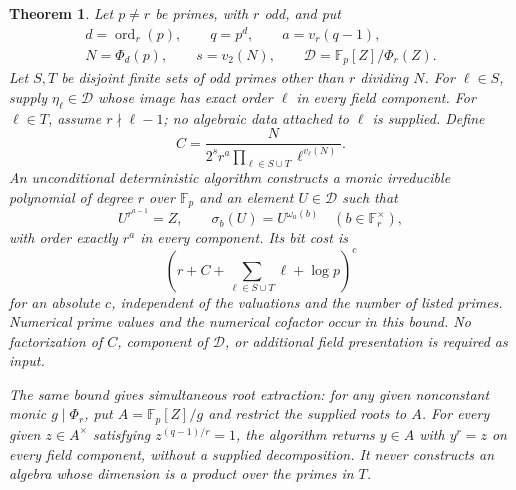 \documentclass[11pt]{article}
\newtheorem{theorem}{Theorem}[section]
\theoremstyle{definition}
\theoremstyle{remark}
\begin{document}
\begin{theorem}\label{thm:selected-cyclotomic-cofactor}
Let \(p\ne r\) be primes, with \(r\) odd, and put
\[
 \begin{gathered}
 d=\operatorname{ord}_r(p),\qquad q=p^d,\qquad a=v_r(q-1),\\
 N=\Phi_d(p),\qquad s=v_2(N),\qquad
 \mathcal D=\mathbb F_p[Z]/\Phi_r(Z).
 \end{gathered}
\]
Let \(S,T\) be disjoint finite sets of odd primes other than \(r\)
dividing \(N\). For \(\ell\in S\), supply
\(\eta_\ell\in\mathcal D\) whose image has exact order \(\ell\)
in every field component. For \(\ell\in T\), assume
\(r\nmid\ell-1\); no algebraic data attached to \(\ell\) is supplied.
Define
\[
 C=\frac{N}{2^s r^a
                  \prod_{\ell\in S\cup T}\ell^{v_\ell(N)}}.
\]
An unconditional deterministic algorithm constructs a monic
irreducible polynomial of degree \(r\) over \(\mathbb F_p\) and
an element \(U\in\mathcal D\) such that
\[
 U^{r^{a-1}}=Z,\qquad
 \sigma_b(U)=U^{\omega_a(b)}\quad(b\in\mathbb F_r^\times),
\]
with order exactly \(r^a\) in every component. Its bit cost is
\[
              \left(r+C+\sum_{\ell\in S\cup T}\ell+\log p\right)^c
\]
for an absolute \(c\), independent of the valuations and the number
of listed primes. Numerical prime values and the numerical cofactor
occur in this bound. No factorization of \(C\), component of
\(\mathcal D\), or additional field presentation is required as input.

The same bound gives simultaneous root extraction: for any given
nonconstant monic \(g\mid\Phi_r\), put
\(A=\mathbb F_p[Z]/g\) and restrict the supplied roots to \(A\).
For every given \(z\in A^\times\) satisfying
\(z^{(q-1)/r}=1\), the algorithm returns \(y\in A\) with
\(y^r=z\) on every field component, without a supplied decomposition.
It never constructs an algebra whose dimension is a product over
the primes in \(T\).
\end{theorem}
\end{document}
